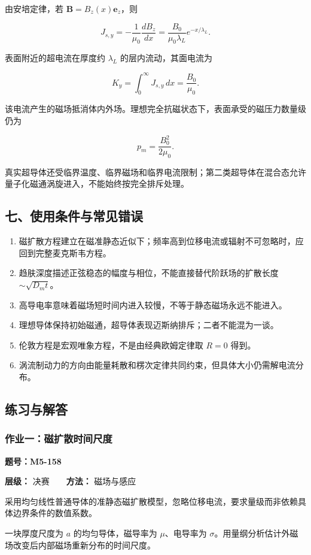 由安培定律，若 \(\mathbf B=B_z(x)\mathbf e_z\)，则

\[
J_{s,y}=-\frac1{\mu_0}\frac{dB_z}{dx}
=\frac{B_0}{\mu_0\lambda_L}e^{-x/\lambda_L}.
\]

表面附近的超电流在厚度约 \(\lambda_L\) 的层内流动，其面电流为

\[
K_y=\int_0^{\infty} J_{s,y}\,dx
=\frac{B_0}{\mu_0}.
\]

该电流产生的磁场抵消体内外场。理想完全抗磁状态下，表面承受的磁压力数量级仍为

\[
\boxed{p_m=\frac{B_0^2}{2\mu_0}}.
\]

真实超导体还受临界温度、临界磁场和临界电流限制；第二类超导体在混合态允许量子化磁通涡旋进入，不能始终按完全排斥处理。

\subsection{七、使用条件与常见错误}\label{m5:ux4e03ux4f7fux7528ux6761ux4ef6ux4e0eux5e38ux89c1ux9519ux8bef-1}

\begin{enumerate}
\def\labelenumi{\arabic{enumi}.}
\tightlist
\item
  磁扩散方程建立在磁准静态近似下；频率高到位移电流或辐射不可忽略时，应回到完整麦克斯韦方程。
\item
  趋肤深度描述正弦稳态的幅度与相位，不能直接替代阶跃场的扩散长度
  \(\sim\sqrt{D_mt}\)。
\item
  高导电率意味着磁场短时间内进入较慢，不等于静态磁场永远不能进入。
\item
  理想导体保持初始磁通，超导体表现迈斯纳排斥；二者不能混为一谈。
\item
  伦敦方程是宏观唯象方程，不是由经典欧姆定律取 \(R=0\) 得到。
\item
  涡流制动力的方向由能量耗散和楞次定律共同约束，但具体大小仍需解电流分布。
\end{enumerate}

\subsection{练习与解答}\label{m5:ux7ec3ux4e60ux4e0eux89e3ux7b54-8}

\par{}
\noindent\begin{minipage}{\linewidth}

\subsubsection{作业一：磁扩散时间尺度}\label{m5:ux4f5cux4e1aux4e00ux78c1ux6269ux6563ux65f6ux95f4ux5c3aux5ea6}

\textbf{题号：M5-158}

\textbf{层级：} 决赛　　\textbf{方法：} 磁场与感应

采用均匀线性普通导体的准静态磁扩散模型，忽略位移电流，要求量级而非依赖具体边界条件的数值系数。

一块厚度尺度为 \(a\) 的均匀导体，磁导率为 \(\mu\)、电导率为
\(\sigma\)。用量纲分析估计外磁场改变后内部磁场重新分布的时间尺度。

\end{minipage}\par


